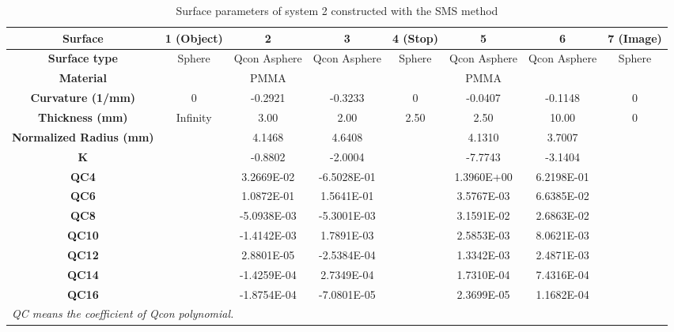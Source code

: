 \setlength{\arrayrulewidth}{.5mm}
\setlength{\tabcolsep}{18pt}
\renewcommand{\arraystretch}{1.2}
\begin{table}[h!]
    \centering
    \captionsetup{justification=centering}
    \caption{Surface parameters of system 2 constructed with the SMS method}
    \label{table: chap5 - sys2 - SMS+OPT}
    \vspace{-1em}
    \begin{adjustbox}{max width=\textwidth, center}
    \begin{tabular}{c c c c c c c c}
    \hline 
     \textbf{Surface} & \textbf{1 (Object)} & \textbf{2}  & \textbf{3} &\textbf{4 (Stop)} & \textbf{5} & \textbf{6} & \textbf{7 (Image)}\\ 
     \midrule
    \rowcolor[gray]{0.9}  \textbf{Surface type} & Sphere & Qcon Asphere & Qcon Asphere & Sphere & Qcon Asphere & Qcon Asphere & Sphere \\ 
    \textbf{Material} &  & PMMA &  & & PMMA & & \\
   \rowcolor[gray]{0.9}  \textbf{Curvature (1/mm)} & 0 & -0.2921 & -0.3233 & 0 & -0.0407 & -0.1148 & 0\\
    \textbf{Thickness (mm)} & Infinity & 3.00 & 2.00 & 2.50 & 2.50 & 10.00 & 0 \\ 
    \rowcolor[gray]{0.9} \textbf{Normalized Radius (mm)} & & 4.1468 & 4.6408 & & 4.1310 & 3.7007 & \\
    \textbf{K} & & -0.8802 & -2.0004 & &  -7.7743 & -3.1404 &\\
    \rowcolor[gray]{0.9} \textbf{QC4} & &   3.2669E-02 &  -6.5028E-01 & &  1.3960E+00 &    6.2198E-01 &  \\ 
    \textbf{QC6} & &    1.0872E-01 &   1.5641E-01 & &   3.5767E-03 &   6.6385E-02 &\\
   \rowcolor[gray]{0.9}  \textbf{QC8} & & -5.0938E-03 &  -5.3001E-03 &  &  3.1591E-02 &    2.6863E-02 & \\
    \textbf{QC10} & & -1.4142E-03 &    1.7891E-03 & &   2.5853E-03 &   8.0621E-03 & \\ 
   \rowcolor[gray]{0.9}  \textbf{QC12} & &   2.8801E-05 & -2.5384E-04 & &   1.3342E-03 &    2.4871E-03 &\\
    \textbf{QC14} & & -1.4259E-04 &  2.7349E-04 & &   1.7310E-04 &    7.4316E-04 & \\ 
   \rowcolor[gray]{0.9}  \textbf{QC16} & & -1.8754E-04 & -7.0801E-05 & &  2.3699E-05 &  1.1682E-04 &\\
    \hline
    \multicolumn{6}{l}{\textit{\footnotesize{QC means the coefficient of Qcon polynomial.}}}\\
    \end{tabular}
    \end{adjustbox}
\end{table}


